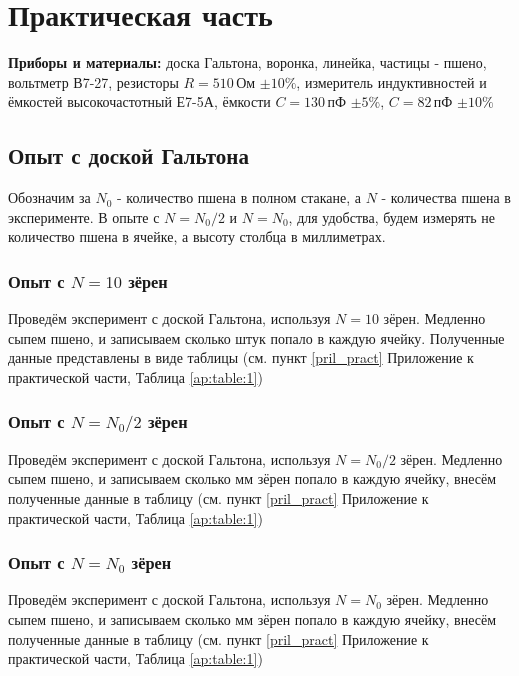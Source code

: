 \section{Практическая часть}

\textbf{Приборы и материалы:} доска Гальтона, воронка, линейка, частицы - пшено, вольтметр В7-27, резисторы $R = 510\,$Ом $\pm10\%$, измеритель индуктивностей и ёмкостей высокочастотный Е7-5А, ёмкости $ C = 130\,$пФ $\pm5\%$, $C = 82\,$пФ $\pm10\%$

\subsection{Опыт с доской Гальтона}

Обозначим за $N_0$ - количество пшена в полном стакане, а $N$ - количества пшена в эксперименте. В опыте с $N = N_0 / 2$ и $N = N_0$, для удобства, будем измерять не количество пшена в ячейке, а высоту столбца в миллиметрах.
	
\subsubsection{Опыт с $N = 10$ зёрен}

Проведём эксперимент с доской Гальтона, используя $N = 10$ зёрен. Медленно сыпем пшено, и записываем сколько штук попало в каждую ячейку. Полученные данные представлены в виде таблицы (см. пункт \ref{pril_pract} Приложение к практической части, Таблица \ref{ap:table:1})

\subsubsection{Опыт с $N = N_0 / 2$ зёрен}

Проведём эксперимент с доской Гальтона, используя $N = N_0 / 2$ зёрен. Медленно сыпем пшено, и записываем сколько мм зёрен попало в каждую ячейку, внесём полученные данные в таблицу (см. пункт \ref{pril_pract} Приложение к практической части, Таблица \ref{ap:table:1})


\subsubsection{Опыт с $N = N_0$ зёрен} 

Проведём эксперимент с доской Гальтона, используя $N = N_0$ зёрен. Медленно сыпем пшено, и записываем сколько мм зёрен попало в каждую ячейку, внесём полученные данные в таблицу (см. пункт \ref{pril_pract} Приложение к практической части, Таблица \ref{ap:table:1})

